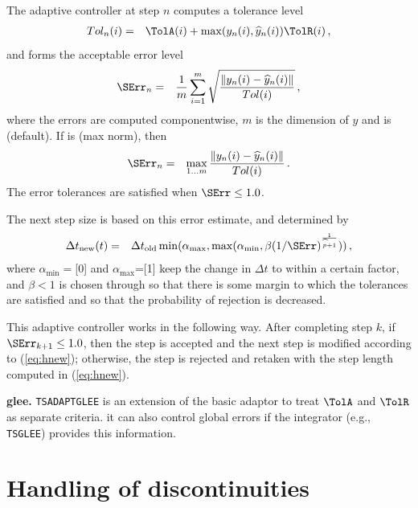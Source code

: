 The adaptive controller at step $n$ computes a tolerance level
\begin{eqnarray*}
Tol_n(i)&=&\TolA(i) +  \max(y_n(i),\widehat{y}_n(i)) \TolR(i)\,,
\end{eqnarray*}
and forms the acceptable error level
\begin{eqnarray*}
\SErr_n&=& \frac{1}{m} \sum_{i=1}^{m}\sqrt{\frac{\left\|y_n(i)
  -\widehat{y}_n(i)\right\|}{Tol(i)}}\,,
\end{eqnarray*}
where the errors are computed componentwise, $m$ is the dimension of
$y$ and  is  (default).
If  is  (max norm), then
\begin{eqnarray*}
\SErr_n&=& \max_{1\dots m}\frac{\left\|y_n(i)
  -\widehat{y}_n(i)\right\|}{Tol(i)}\,.
\end{eqnarray*}
The error tolerances are satisfied when $\SErr \le 1.0$.

The next step size is based on this error estimate, and determined by
\begin{eqnarray}
  \label{eq:hnew}
 \Delta t_{\rm new}(t)&=&\Delta t_{\rm{old}} \min(\alpha_{\max},
 \max(\alpha_{\min}, \beta (1/\SErr)^\frac{1}{\widehat{p}+1}))\,,
\end{eqnarray}
where $\alpha_{\min}=$[0] and
$\alpha_{\max}$=[1] keep the change in
$\Delta t$
to within a certain factor, and $\beta<1$ is chosen
through  so that there is
some margin to which the tolerances are satisfied and so that the
probability of rejection is decreased.

This adaptive controller works in the following way. After completing
step $k$, if $\SErr_{k+1} \le 1.0$, then the step is accepted and the
next step is modified according to (\ref{eq:hnew}); otherwise, the step
is rejected and retaken with the step length computed in (\ref{eq:hnew}).

\noindent\textbf{ glee.} \lstinline{TSADAPTGLEE} is an extension of
the basic adaptor to treat $\TolA$ and $\TolR$ as separate criteria.
it can also control global errors if the integrator (e.g., \lstinline{TSGLEE})
provides this information.

\section{Handling of discontinuities}

